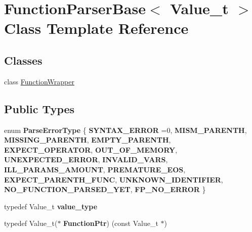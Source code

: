 \hypertarget{class_function_parser_base}{}\section{Function\+Parser\+Base$<$ Value\+\_\+t $>$ Class Template Reference}
\label{class_function_parser_base}
\subsection*{Classes}
\begin{DoxyCompactItemize}
\item 
class \hyperlink{class_function_parser_base_1_1_function_wrapper}{Function\+Wrapper}
\end{DoxyCompactItemize}
\subsection*{Public Types}
\begin{DoxyCompactItemize}
\item 
\mbox{\label{class_function_parser_base_a1126e1f068b31fb3ea89ffc3918f9aa8}} 
enum {\bfseries Parse\+Error\+Type} \{ \newline
{\bfseries S\+Y\+N\+T\+A\+X\+\_\+\+E\+R\+R\+OR} =0, 
{\bfseries M\+I\+S\+M\+\_\+\+P\+A\+R\+E\+N\+TH}, 
{\bfseries M\+I\+S\+S\+I\+N\+G\+\_\+\+P\+A\+R\+E\+N\+TH}, 
{\bfseries E\+M\+P\+T\+Y\+\_\+\+P\+A\+R\+E\+N\+TH}, 
\newline
{\bfseries E\+X\+P\+E\+C\+T\+\_\+\+O\+P\+E\+R\+A\+T\+OR}, 
{\bfseries O\+U\+T\+\_\+\+O\+F\+\_\+\+M\+E\+M\+O\+RY}, 
{\bfseries U\+N\+E\+X\+P\+E\+C\+T\+E\+D\+\_\+\+E\+R\+R\+OR}, 
{\bfseries I\+N\+V\+A\+L\+I\+D\+\_\+\+V\+A\+RS}, 
\newline
{\bfseries I\+L\+L\+\_\+\+P\+A\+R\+A\+M\+S\+\_\+\+A\+M\+O\+U\+NT}, 
{\bfseries P\+R\+E\+M\+A\+T\+U\+R\+E\+\_\+\+E\+OS}, 
{\bfseries E\+X\+P\+E\+C\+T\+\_\+\+P\+A\+R\+E\+N\+T\+H\+\_\+\+F\+U\+NC}, 
{\bfseries U\+N\+K\+N\+O\+W\+N\+\_\+\+I\+D\+E\+N\+T\+I\+F\+I\+ER}, 
\newline
{\bfseries N\+O\+\_\+\+F\+U\+N\+C\+T\+I\+O\+N\+\_\+\+P\+A\+R\+S\+E\+D\+\_\+\+Y\+ET}, 
{\bfseries F\+P\+\_\+\+N\+O\+\_\+\+E\+R\+R\+OR}
 \}
\item 
\mbox{\label{class_function_parser_base_a9cc3978ca1d4fca4244b367fc62d4a45}} 
typedef Value\+\_\+t {\bfseries value\+\_\+type}
\item 
\mbox{\label{class_function_parser_base_abf70d4a8970e7174d857c464bf1019a3}} 
typedef Value\+\_\+t($\ast$ {\bfseries Function\+Ptr}) (const Value\+\_\+t $\ast$)
\end{DoxyCompactItemize}
